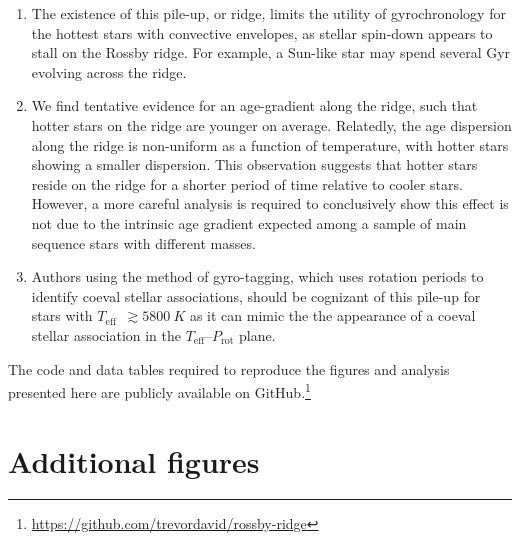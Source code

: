 \documentclass[twocolumn]{aastex631}
\newcommand{\teff}{\ensuremath{T_{\mathrm{eff}}}\xspace}
\newcommand{\prot}{\ensuremath{P_\mathrm{rot}}\xspace}
\newcommand{\rvar}{\ensuremath{R_\mathrm{var}}\xspace}
\begin{document}
\begin{enumerate}
    
    \item The existence of this pile-up, or ridge, limits the utility of gyrochronology for the hottest stars with convective envelopes, as stellar spin-down appears to stall on the Rossby ridge. For example, a Sun-like star may spend several Gyr evolving across the ridge.
    
    \item We find tentative evidence for an age-gradient along the ridge, such that hotter stars on the ridge are younger on average. Relatedly, the age dispersion along the ridge is non-uniform as a function of temperature, with hotter stars showing a smaller dispersion. This observation suggests that hotter stars reside on the ridge for a shorter period of time relative to cooler stars. However, a more careful analysis is required to conclusively show this effect is not due to the intrinsic age gradient expected among a sample of main sequence stars with different masses.
    
    \item Authors using the method of gyro-tagging, which uses rotation periods to identify coeval stellar associations, should be cognizant of this pile-up for stars with \teff~$\gtrsim5800~K$ as it can mimic the the appearance of a coeval stellar association in the \teff--\prot plane.   
    
\end{enumerate}

The code and data tables required to reproduce the figures and analysis presented here are publicly available on GitHub.\footnote{\url{https://github.com/trevordavid/rossby-ridge}}

\newpage 
\appendix 
\section{Additional figures}


\end{document}
